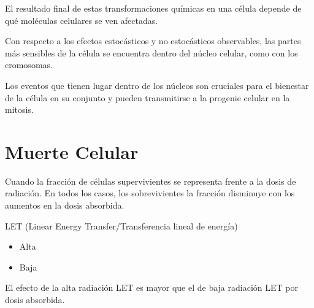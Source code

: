 \documentclass{beamer}
\begin{document}

\begin{frame}
	
	\begin{block}{}
		El resultado final de estas transformaciones químicas en una célula depende de qué moléculas celulares se ven afectadas.\\
	\end{block}

  \begin{block}{}
    
     Con respecto a los efectos estocásticos y no estocásticos observables, las partes más sensibles de la célula se encuentra dentro del núcleo celular, como con los cromosomas.\\	
  \end{block}

  \begin{block}{}
	Los eventos que tienen lugar dentro de los núcleos son cruciales para el bienestar de la célula en su conjunto y pueden transmitirse a la progenie celular en la mitosis.\\
\end{block}

\end{frame}


\section{Muerte Celular}


\begin{frame}
   
   
   \begin{block}{}
   	   Cuando la fracción de células supervivientes se representa frente a la dosis de radiación. En todos los casos, los sobrevivientes la fracción disminuye con los aumentos en la dosis absorbida.
   \end{block}


\begin{block}{LET (Linear Energy Transfer/Transferencia lineal de energía)}

    \begin{itemize}
    	\item Alta
    	\item Baja
    \end{itemize}

\end{block}

   
   \begin{block}{}
   	El efecto de la alta radiación LET es mayor que el de baja radiación LET por dosis absorbida.
   \end{block}
   
   	
\end{frame}
\end{document}
